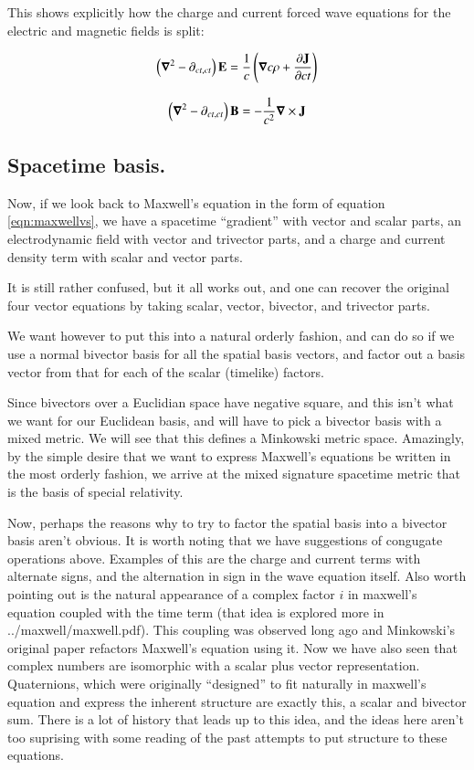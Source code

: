 \documentclass{article}
\newcommand{\spacegrad}[0]{\boldsymbol{\nabla}}
\begin{document}
This shows explicitly how the charge and current forced wave equations for the 
electric and magnetic fields is split:

\begin{equation*}
\left(\spacegrad^2 - \partial_{ct, ct}\right) \BE = 
\inv{c } \left(\spacegrad c \rho + \frac{\partial \BJ}{\partial c t} \right)
\end{equation*}

\begin{equation*}
\left(\spacegrad^2 - \partial_{ct, ct}\right) \BB = - \inv{c^2 }  \spacegrad \cross \BJ
\end{equation*}

\subsection{ Spacetime basis. }

Now, if we look back to Maxwell's equation in the form of equation \ref{eqn:maxwellvs}, we have a spacetime ``gradient'' with vector and scalar parts, an electrodynamic field with vector and trivector parts, and a charge and current density term with scalar and vector parts.  

It is still rather confused, but it all works out, and one can recover the original four vector equations by taking scalar, vector, bivector, and trivector parts. 

We want however to put this into a natural orderly fashion, and can do so if we use a normal bivector basis for all the spatial basis vectors, and factor out a basis vector from that for each of the scalar (timelike) factors.

Since bivectors over a Euclidian space have negative square, and this isn't what we want for our Euclidean basis, and will have to
pick a bivector basis with a mixed metric.  We will see that this defines a Minkowski metric space.  Amazingly, by the simple 
desire that we want to express
Maxwell's equations be written in the most orderly fashion, we arrive at the mixed signature spacetime metric that is the basis
of special relativity.

Now, perhaps the reasons why to try to factor the spatial basis into a bivector basis aren't obvious.  It is worth noting that
we have suggestions of congugate operations above.  Examples of this are the charge and current terms with alternate signs, and
the alternation in sign in the wave equation itself.  Also worth pointing out is the natural appearance of a complex factor $i$
in maxwell's equation coupled with the time term (that idea is explored more in ../maxwell/maxwell.pdf).  This coupling was 
observed long ago and Minkowski's original paper refactors Maxwell's equation using it.  Now we have also seen that complex numbers
are isomorphic with a scalar plus vector representation.  Quaternions, which were originally ``designed'' to fit naturally 
in maxwell's equation and express the inherent structure are exactly this, a scalar and bivector sum.  There is a lot of history
that leads up to this idea, and the ideas here aren't too suprising with some reading of the past attempts to put structure to these
equations.
\end{document}
